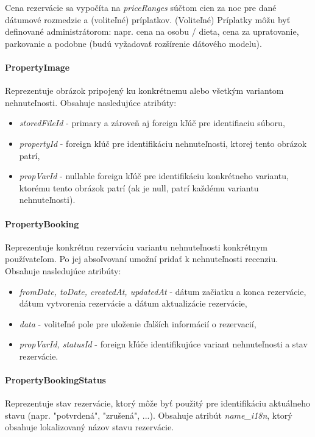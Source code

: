 Cena rezervácie sa vypočíta na \textit{priceRanges} súčtom cien za noc pre dané dátumové rozmedzie a (voliteľné) príplatkov.
(Voliteľné) Príplatky môžu byť definované administrátorom: napr. cena na osobu / dieta, cena za upratovanie, parkovanie a podobne (budú vyžadovať rozšírenie dátového modelu).

\paragraph{PropertyImage} \text{ } \newline
Reprezentuje obrázok pripojený ku konkrétnemu alebo všetkým variantom nehnuteľnosti.
Obsahuje nasledujúce atribúty:
\begin{itemize}
    \item \textit{storedFileId} - primary a zároveň aj foreign kľúč pre identifiaciu súboru,
    \item \textit{propertyId} - foreign kľúč pre identifikáciu nehnuteľnosti, ktorej tento obrázok patrí,
    \item \textit{propVarId} - nullable foreign kľúč pre identifikáciu konkrétneho variantu, ktorému tento obrázok patrí (ak je null, patrí každému variantu nehnuteľnosti).
\end{itemize}



\paragraph{PropertyBooking} \text{ } \newline
Reprezentuje konkrétnu rezerváciu variantu nehnuteľnosti konkrétnym používateľom. Po jej absoľvovaní umožní pridať k nehnuteľnosti recenziu.
Obsahuje nasledujúce atribúty:
\begin{itemize}[itemsep=2pt]
    \item \textit{fromDate, toDate, createdAt, updatedAt} - dátum začiatku a konca rezervácie, dátum vytvorenia rezervácie a dátum aktualizácie rezervácie,
    \item \textit{data} - voliteľné pole pre uloženie ďalších informácií o rezervacií,
    \item \textit{propVarId, statusId} - foreign kľúče identifikujúce variant nehnuteľnosti a stav rezervácie.
\end{itemize}

\paragraph{PropertyBookingStatus} \text{ } \newline
Reprezentuje stav rezervácie, ktorý môže byť použitý pre identifikáciu aktuálneho stavu (napr. "potvrdená", "zrušená", ...).
Obsahuje atribút \textit{name\_i18n}, ktorý obsahuje lokalizovaný názov stavu rezervácie.

